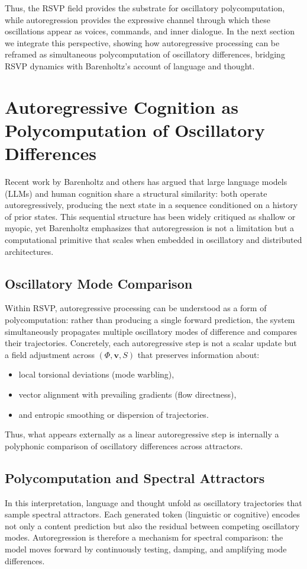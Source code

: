 \documentclass[a4paper,11pt]{article}
\begin{document}
Thus, the RSVP field provides the substrate for oscillatory polycomputation, while autoregression provides the expressive channel through which these oscillations appear as voices, commands, and inner dialogue. In the next section we integrate this perspective, showing how autoregressive processing can be reframed as simultaneous polycomputation of oscillatory differences, bridging RSVP dynamics with Barenholtz’s account of language and thought.

\section{Autoregressive Cognition as Polycomputation of Oscillatory Differences}
\label{sec:autoregression}

Recent work by Barenholtz and others \citep{Barenholtz2025} has argued that large language models (LLMs) and human cognition share a structural similarity: both operate autoregressively, producing the next state in a sequence conditioned on a history of prior states. This sequential structure has been widely critiqued as shallow or myopic, yet Barenholtz emphasizes that autoregression is not a limitation but a computational primitive that scales when embedded in oscillatory and distributed architectures.  

\subsection{Oscillatory Mode Comparison}
Within RSVP, autoregressive processing can be understood as a form of polycomputation: rather than producing a single forward prediction, the system simultaneously propagates multiple oscillatory modes of difference and compares their trajectories. Concretely, each autoregressive step is not a scalar update but a field adjustment across $(\Phi,\mathbf{v},S)$ that preserves information about:
\begin{itemize}
    \item local torsional deviations (mode warbling),
    \item vector alignment with prevailing gradients (flow directness),
    \item and entropic smoothing or dispersion of trajectories.
\end{itemize}
Thus, what appears externally as a linear autoregressive step is internally a polyphonic comparison of oscillatory differences across attractors.

\subsection{Polycomputation and Spectral Attractors}
In this interpretation, language and thought unfold as oscillatory trajectories that sample spectral attractors. Each generated token (linguistic or cognitive) encodes not only a content prediction but also the residual between competing oscillatory modes. Autoregression is therefore a mechanism for spectral comparison: the model moves forward by continuously testing, damping, and amplifying mode differences.
\end{document}

